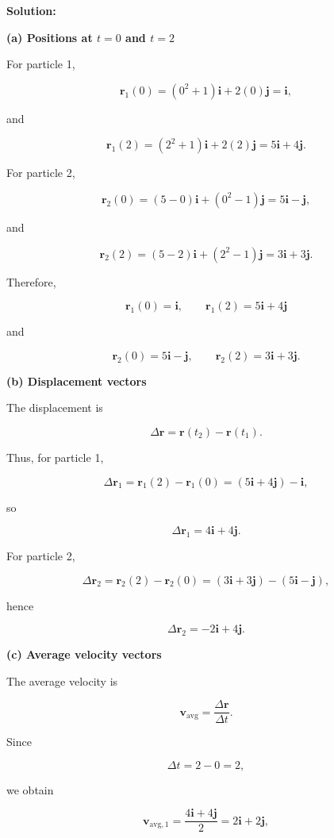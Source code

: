 \documentclass[../main.tex]{subfiles}
\theoremstyle{remark}
\begin{document}
\textbf{Solution:}

\textbf{(a) Positions at \(t=0\) and \(t=2\)}

For particle 1,

\[
\mathbf{r}_1(0)
=
(0^2+1)\mathbf{i}+2(0)\mathbf{j}
=
\mathbf{i},
\]

and

\[
\mathbf{r}_1(2)
=
(2^2+1)\mathbf{i}+2(2)\mathbf{j}
=
5\mathbf{i}+4\mathbf{j}.
\]

For particle 2,

\[
\mathbf{r}_2(0)
=
(5-0)\mathbf{i}+(0^2-1)\mathbf{j}
=
5\mathbf{i}-\mathbf{j},
\]

and

\[
\mathbf{r}_2(2)
=
(5-2)\mathbf{i}+(2^2-1)\mathbf{j}
=
3\mathbf{i}+3\mathbf{j}.
\]

Therefore,

\[
\boxed{
\mathbf{r}_1(0)=\mathbf{i},
\qquad
\mathbf{r}_1(2)=5\mathbf{i}+4\mathbf{j}
}
\]

and

\[
\boxed{
\mathbf{r}_2(0)=5\mathbf{i}-\mathbf{j},
\qquad
\mathbf{r}_2(2)=3\mathbf{i}+3\mathbf{j}.
}
\]

\textbf{(b) Displacement vectors}

The displacement is

\[
\Delta \mathbf{r}
=
\mathbf{r}(t_2)-\mathbf{r}(t_1).
\]

Thus, for particle 1,

\[
\Delta \mathbf{r}_1
=
\mathbf{r}_1(2)-\mathbf{r}_1(0)
=
(5\mathbf{i}+4\mathbf{j})-\mathbf{i},
\]

so

\[
\boxed{
\Delta \mathbf{r}_1
=
4\mathbf{i}+4\mathbf{j}.
}
\]

For particle 2,

\[
\Delta \mathbf{r}_2
=
\mathbf{r}_2(2)-\mathbf{r}_2(0)
=
(3\mathbf{i}+3\mathbf{j})-(5\mathbf{i}-\mathbf{j}),
\]

hence

\[
\boxed{
\Delta \mathbf{r}_2
=
-2\mathbf{i}+4\mathbf{j}.
}
\]

\textbf{(c) Average velocity vectors}

The average velocity is

\[
\mathbf{v}_{\mathrm{avg}}
=
\frac{\Delta\mathbf{r}}{\Delta t}.
\]

Since

\[
\Delta t=2-0=2,
\]

we obtain

\[
\mathbf{v}_{\mathrm{avg},1}
=
\frac{4\mathbf{i}+4\mathbf{j}}{2}
=
2\mathbf{i}+2\mathbf{j},
\]
\end{document}
